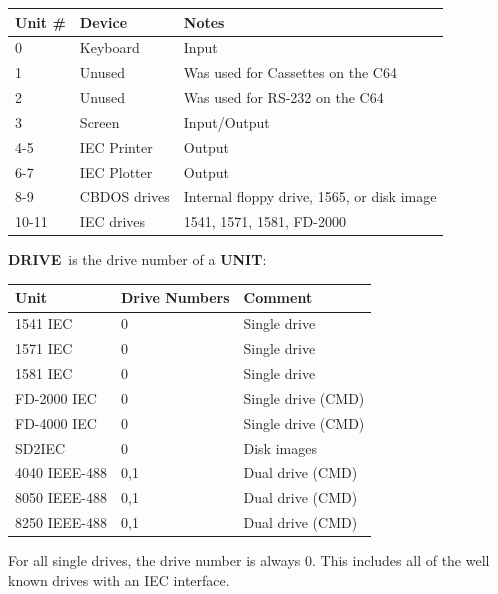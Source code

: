 \setlength{\tabcolsep}{1mm}
\begin{center}
\begin{tabular}{|l|l|l|}
\hline
{\bf Unit} \# & {\bf Device}  & {\bf Notes} \\
\hline
0        & Keyboard & Input \\
1        & Unused   & Was used for Cassettes on the C64 \\
2        & Unused   & Was used for RS-232 on the C64 \\
3        & Screen   & Input/Output     \\
4-5      & IEC Printer  & Output     \\
6-7      & IEC Plotter  & Output     \\
8-9      & CBDOS drives\footnotemark{} & Internal floppy drive, 1565\footnotemark{}, or disk image \\
10-11    & IEC drives   & 1541, 1571, 1581, FD-2000 \\
\hline
\end{tabular}
\end{center}
\addtocounter{footnote}{-2}

{\bf DRIVE} is the drive number of a {\bf UNIT}:

\setlength{\tabcolsep}{1mm}
\begin{center}
\begin{tabular}{|l|l|l|}
\hline
{\bf Unit}  & {\bf Drive Numbers} & {\bf Comment} \\
\hline
1541 IEC & 0             & Single drive \\
1571 IEC & 0             & Single drive \\
1581 IEC & 0             & Single drive \\
FD-2000 IEC & 0             & Single drive (CMD)\\
FD-4000 IEC & 0             & Single drive (CMD)\\
SD2IEC      & 0             & Disk images\\
4040 IEEE-488 & 0,1             & Dual drive (CMD)\\
8050 IEEE-488 & 0,1             & Dual drive (CMD)\\
8250 IEEE-488 & 0,1             & Dual drive (CMD)\\
\hline
\end{tabular}
\end{center}
For all single drives, the drive number is always 0.
This includes all of the well known drives with an IEC interface.

